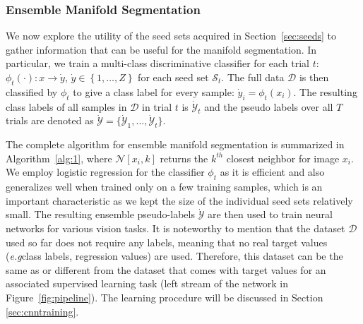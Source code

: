 \documentclass{bmvc2k}
\newcommand{\braces}[1]{\left\{ #1 \right\}}
\def\eg{\emph{e.g}\bmvaOneDot}
\begin{document}

\subsubsection{Ensemble Manifold Segmentation} 

We now explore the utility of the seed sets acquired in 
Section~\ref{sec:seeds} to gather information that can be useful for 
the manifold segmentation.  In particular, we train a multi-class 
discriminative classifier for each trial $t$: $\phi_t(\cdot): x 
\rightarrow \dot{y}$,  $\dot{y} \in \braces{1, \ldots, Z}$ for each 
seed set $\mathcal{S}_t$. The full data $\mathcal{D}$ is then classified 
by $\phi_t$ to give a class label for every sample: $\dot{y}_i = 
\phi_t(x_i)$.  The resulting class labels of all samples in $\mathcal{D}$ 
in trial $t$ is $\dot{\mathcal{Y}}_t$ and the pseudo labels over all $T$ 
trials are denoted as $\dot{\mathcal{Y}}=\{ \dot{\mathcal{Y}}_1, ..., 
\dot{\mathcal{Y}}_t\}$.  

The complete algorithm for ensemble manifold segmentation is summarized
in Algorithm~\ref{alg:1}, where $\mathcal{N}[x_i, k]$ returns the
$k^{th}$ closest neighbor for image $x_i$. We
employ logistic regression for the classifier $\phi_t$ as it is 
efficient and also generalizes well when trained only on a few
training samples, which is an important characteristic as we kept the
size of the individual seed sets relatively small. The resulting ensemble
pseudo-labels $\dot{\mathcal{Y}}$ are then used to train neural
networks for various vision tasks. It is noteworthy to mention that 
the dataset $\mathcal{D}$ used so far does not require any labels, meaning
that no real target values (\eg class labels, regression values) are 
used. Therefore, this dataset can be the same as or different from 
the dataset that comes with target values for an associated supervised 
learning task (left stream of the network in Figure~\ref{fig:pipeline}).  
The learning procedure will be discussed in Section \ref{sec:cnntraining}. 

\end{document}
